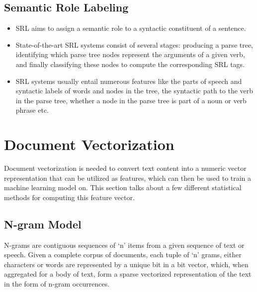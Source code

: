 \documentclass[11pt,a4paper]{article}
\begin{document}

  \subsection{Semantic Role Labeling} %
  \label{sub:semantic_role_labeling}

    \begin{itemize}
      \item
      SRL aims to assign a semantic role to a syntactic constituent of a sentence.
      \item
      State-of-the-art SRL systems consist of several stages: producing a parse tree, identifying which parse tree nodes represent the arguments of a given verb, and finally classifying these nodes to compute the corresponding SRL tags.
      \item
      SRL systems usually entail numerous features like the parts of speech and syntactic labels of words and nodes in the tree, the syntactic path to the verb in the parse tree, whether a node in the parse tree is part of a noun or verb phrase etc.
    \end{itemize}





\section{Document Vectorization} %
\label{sec:document_vectorization}

  Document vectorization is needed to convert text content into a numeric vector representation that can be utilized as features, which can then be used to train a machine learning model on. This section talks about a few different statistical methods for computing this feature vector\cite{SemEvalPaper}.

  \subsection{N-gram Model} %
  \label{sub:n_gram_model}
    N-grams are contiguous sequences of `n' items from a given sequence of text or speech. Given a complete corpus of documents, each tuple of `n' grams, either characters or words are represented by a unique bit in a bit vector, which, when aggregated for a body of text, form a sparse vectorized representation of the text in the form of n-gram occurrences.
\end{document}
